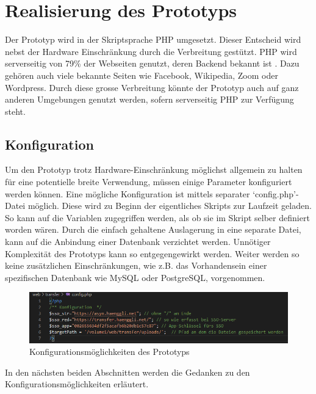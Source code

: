 \chapter{Realisierung des Prototyps}\label{chapter:Realisierung}
Der Prototyp wird in der Skriptsprache PHP umgesetzt. 
Dieser Entscheid wird nebst der Hardware Einschränkung durch die Verbreitung gestützt.
PHP wird serverseitig von 79\% der Webseiten genutzt, deren Backend bekannt ist \cite[gemäss Stand Juni 2020]{w3techs}. 
Dazu gehören auch viele bekannte Seiten wie Facebook, Wikipedia, Zoom oder Wordpress.
Durch diese grosse Verbreitung könnte der Prototyp auch auf ganz anderen Umgebungen genutzt werden, sofern serverseitig PHP zur Verfügung steht.

\section{Konfiguration}
Um den Prototyp trotz Hardware-Einschränkung möglichst allgemein zu halten für eine potentielle breite Verwendung, 
müssen einige Parameter konfiguriert werden können. 
Eine mögliche Konfiguration ist mittels separater `config.php'-Datei möglich. 
Diese wird zu Beginn der eigentliches Skripts zur Laufzeit geladen. So kann auf die Variablen zugegriffen werden,
als ob sie im Skript selber definiert worden wären. 
Durch die einfach gehaltene Auslagerung in eine separate Datei, kann auf die Anbindung einer Datenbank verzichtet werden. 
Unnötiger Komplexität des Prototyps kann so entgegengewirkt werden. 
Weiter werden so keine zusätzlichen Einschränkungen, wie z.B. das Vorhandensein einer spezifischen Datenbank wie MySQL oder PostgreSQL, vorgenommen.

\begin{figure}[h]
    \centering
    \includegraphics[width=1\linewidth]{content/images/prototyp_konfiguration.png}
    \caption{Konfigurationsmöglichkeiten des Prototyps}
    \label{fig:Konfigurationsmoeglichkeiten_prototyp}
\end{figure}
In den nächsten beiden Abschnitten werden die Gedanken zu den Konfigurationsmöglichkeiten erläutert.

